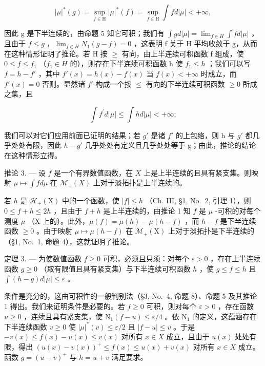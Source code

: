 \[
| \mu | ^ {*} (g) = \sup _ {f \in \mathrm{H}} | \mu | ^ {*} (f) = \sup _ {f \in \mathrm{H}} \int f d | \mu | <   + \infty ,
\]

因此 g 是下半连续的，由命题 5 知它可积；我们有 \(\int g d|\mu| = \lim_{f \in H} \int f d|\mu|\) ，且由于 \(f \leqslant g\) ，\(\lim_{f \in H} N_1(g - f) = 0\) ，这表明 f 关于 H 平均收敛于 g，从而在这种情形证明了推论。若 H 按 \(\geqslant\) 有向，由上半连续可积函数 f 组成，使 \(0 \leqslant f \leqslant f_1\) （\(f_1 \in H\) 的），则存在下半连续可积函数 h 使 \(f_1 \leqslant h\) ；我们可以写 \(f = h - f'\) ，其中 \(f'(x) = h(x) - f(x)\) 当 \(f(x) < +\infty\) 时成立，而 \(f'(x) = 0\) 否则。显然诸 \(f'\) 构成一个按 \(\leqslant\) 有向的下半连续可积函数 \(\geqslant 0\) 所成之集，且

\[
\int f ^ {\prime} d | \mu | \leqslant \int h d | \mu | <   + \infty ;
\]

我们可以对它们应用前面已证明的结果；若 \(g'\) 是诸 \(f'\) 的上包络，则 h 与 \(g'\) 都几乎处处有限，因此 \(h - g'\) 几乎处处有定义且几乎处处等于 g；由此，推论的结论在这种情形立得。

推论 3. --- 设 \(f\) 是一个有界数值函数，在 \(X\) 上是上半连续的且具有紧支集。则映射 \(\mu \mapsto \int f d\mu\) 在 \(\mathcal{M}_{+}(X)\) 上对于淡拓扑是上半连续的。

若 \(h\) 是 \(\mathcal{H}_{+}(\mathrm{X})\) 中的一个函数，使 \(|f| \leqslant h\) （Ch. III, §1, No.~2, 引理 1），则 \(0 \leqslant f + h \leqslant 2h\) ，且由于 \(f + h\) 是上半连续的，由推论 1 知 \(f\) 是 \(\mu\) -可积的对每个测度 \(\mu\) （\(\mathrm{X}\) 上的）。此外，\(\mu(f) = \mu(h) - \mu(h - f)\) ，而 \(h - f\) 是下半连续函数 \(\geqslant 0\) 。由于映射 \(\mu \mapsto \mu(h - f)\) 在 \(\mathcal{M}_{+}(\mathrm{X})\) 上对于淡拓扑是下半连续的（§1, No.~1, 命题 4），这就证明了推论。

定理 3. --- 为使数值函数 \(f \geqslant 0\) 可积，必须且只须：对每个 \(\varepsilon > 0\) ，存在上半连续函数 \(g \geqslant 0\) （取有限值且具有紧支集）与下半连续可积函数 \(h\) ，使 \(g \leqslant f \leqslant h\) 且 \(\int (h - g) d|\mu| \leqslant \varepsilon\) 。

条件是充分的，这由可积性的一般判别法（§3, No.~4, 命题 8）、命题 5 及其推论 1 得出。我们来证明条件是必要的。若 \(f \geqslant 0\) 可积，则对每个 \(\varepsilon > 0\) ，存在函数 \(u \geqslant 0\) ，连续且具有紧支集，使 \(\mathrm{N}_1(f - u) \leqslant \varepsilon / 4\) 。依 \(\mathrm{N}_1\) 的定义，这蕴涵存在下半连续函数 \(v \geqslant 0\) 使 \(|\mu|^*(v) \leqslant \varepsilon / 2\) 且 \(|f - u| \leqslant v\) 。于是 \(-v(x) \leqslant f(x) - u(x) \leqslant v(x)\) 对所有 \(x \in X\) 成立，且由于 \(u(x)\) 处处有限，得出 \((u(x) - v(x))^+ \leqslant f(x) \leqslant u(x) + v(x)\) 对所有 \(x \in X\) 成立。函数 \(g = (u - v)^+\) 与 \(h = u + v\) 满足要求。

